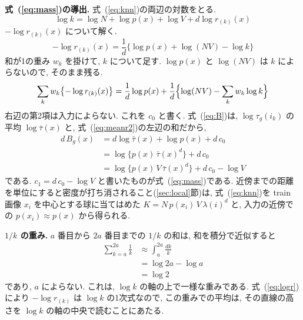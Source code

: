 \documentclass[MIRU,submit]{miru2025j}
\renewcommand{\eqref}[1]{(\ref{#1})}
\begin{document}
\textbf{式~\eqref{eq:mass}の導出.} 式~\eqref{eq:knn}の両辺の対数をとる.
\begin{equation}
\log k=\log N+\log p(x)+\log V+d\log r_{(k)}(x)
\label{eq:logk}
\end{equation}
$-\log r_{(k)}(x)$ について解く.
\begin{equation}
-\log r_{(k)}(x)=\frac{1}{d}\bigl\{\log p(x)+\log(NV)-\log k\bigr\}
\label{eq:logr}
\end{equation}
和が1の重み $w_k$ を掛けて, $k$ について足す. $\log p(x)$ と $\log(NV)$ は $k$ によらないので, そのまま残る.
\begin{equation}
\sum_{k}w_k\bigl\{-\log r_{(k)}(x)\bigr\}=\frac{1}{d}\log p(x)+\frac{1}{d}\Bigl\{\log(NV)-\sum_{k}w_k\log k\Bigr\}
\label{eq:meanr2}
\end{equation}
右辺の第2項は入力によらない. これを $c_0$ と書く. 式~\eqref{eq:B}は, $\log\tau_g(i_k)$ の平均 $\log\bar{\tau}(x)$ と, 式~\eqref{eq:meanr2}の左辺の和だから,
\begin{equation}
\begin{split}
d\,B_g(x)&=d\log\bar{\tau}(x)+\log p(x)+d\,c_0\\
&=\log\bigl\{p(x)\,\bar{\tau}(x)^{d}\bigr\}+d\,c_0\\
&=\log\bigl\{p(x)\,V\,\bar{\tau}(x)^{d}\bigr\}+d\,c_0-\log V
\end{split}
\label{eq:mass2}
\end{equation}
である. $c_1=d\,c_0-\log V$ と書いたものが式~\eqref{eq:mass}である. 近傍までの距離を単位にすると密度が打ち消されること(\ref{sec:local}節)は, 式~\eqref{eq:knn}を train 画像 $x_i$ を中心とする球に当てはめた $K=N\,p(x_i)\,V\,\lambda(i)^{d}$ と, 入力の近傍での $p(x_i)\approx p(x)$ から得られる.

\textbf{$1/k$ の重み.} $a$ 番目から $2a$ 番目までの $1/k$ の和は, 和を積分で近似すると
\begin{equation}
\begin{split}
\sum_{k=a}^{2a}\frac{1}{k}&\approx\int_{a}^{2a}\frac{dk}{k}\\
&=\log 2a-\log a\\
&=\log 2
\end{split}
\label{eq:octave}
\end{equation}
であり, $a$ によらない. これは, $\log k$ の軸の上で一様な重みである. 式~\eqref{eq:logr}により $-\log r_{(k)}$ は $\log k$ の1次式なので, この重みでの平均は, その直線の高さを $\log k$ の軸の中央で読むことにあたる.
\end{document}
